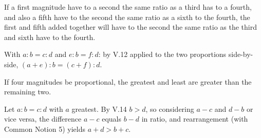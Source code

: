 \begin{claim}
\label{prop:V.24}
If a first magnitude have to a second the same ratio as a third has
to a fourth, and also a fifth have to the second the same ratio as a
sixth to the fourth, the first and fifth added together will have to
the second the same ratio as the third and sixth have to the fourth.
\end{claim}
\begin{evidence}[Proof of V.24]
\label{ev:V.24}
With $a : b = c : d$ and $e : b = f : d$: by V.12 applied to the two
proportions side-by-side, $(a + e) : b = (c + f) : d$.
\end{evidence}

\begin{claim}
\label{prop:V.25}
If four magnitudes be proportional, the greatest and least are greater
than the remaining two.
\end{claim}
\begin{evidence}[Proof of V.25]
\label{ev:V.25}
Let $a : b = c : d$ with $a$ greatest.  By V.14 $b > d$, so
considering $a - c$ and $d - b$ or vice versa, the difference $a - c$
equals $b - d$ in ratio, and rearrangement (with Common Notion 5)
yields $a + d > b + c$.
\end{evidence}

